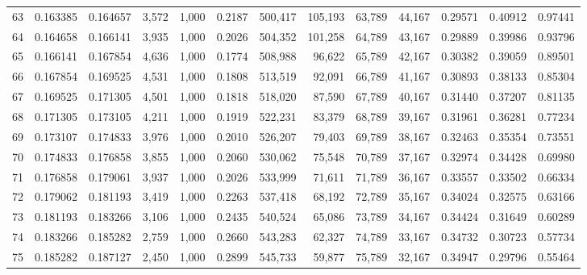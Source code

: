 \begin{tabular}{rrrrrrrrrrrrr}
63  &  0.163385 &  0.164657 &   3,572 &  1,000 &                                     0.2187 &  500,417 &  105,193 &   63,789 &   44,167 &  0.29571 &  0.40912 &  0.97441 \\
64  &  0.164658 &  0.166141 &   3,935 &  1,000 &                                     0.2026 &  504,352 &  101,258 &   64,789 &   43,167 &  0.29889 &  0.39986 &  0.93796 \\
65  &  0.166141 &  0.167854 &   4,636 &  1,000 &                                     0.1774 &  508,988 &   96,622 &   65,789 &   42,167 &  0.30382 &  0.39059 &  0.89501 \\
66  &  0.167854 &  0.169525 &   4,531 &  1,000 &                                     0.1808 &  513,519 &   92,091 &   66,789 &   41,167 &  0.30893 &  0.38133 &  0.85304 \\
67  &  0.169525 &  0.171305 &   4,501 &  1,000 &                                     0.1818 &  518,020 &   87,590 &   67,789 &   40,167 &  0.31440 &  0.37207 &  0.81135 \\
68  &  0.171305 &  0.173105 &   4,211 &  1,000 &                                     0.1919 &  522,231 &   83,379 &   68,789 &   39,167 &  0.31961 &  0.36281 &  0.77234 \\
69  &  0.173107 &  0.174833 &   3,976 &  1,000 &                                     0.2010 &  526,207 &   79,403 &   69,789 &   38,167 &  0.32463 &  0.35354 &  0.73551 \\
70  &  0.174833 &  0.176858 &   3,855 &  1,000 &                                     0.2060 &  530,062 &   75,548 &   70,789 &   37,167 &  0.32974 &  0.34428 &  0.69980 \\
71  &  0.176858 &  0.179061 &   3,937 &  1,000 &                                     0.2026 &  533,999 &   71,611 &   71,789 &   36,167 &  0.33557 &  0.33502 &  0.66334 \\
72  &  0.179062 &  0.181193 &   3,419 &  1,000 &                                     0.2263 &  537,418 &   68,192 &   72,789 &   35,167 &  0.34024 &  0.32575 &  0.63166 \\
73  &  0.181193 &  0.183266 &   3,106 &  1,000 &                                     0.2435 &  540,524 &   65,086 &   73,789 &   34,167 &  0.34424 &  0.31649 &  0.60289 \\
74  &  0.183266 &  0.185282 &   2,759 &  1,000 &                                     0.2660 &  543,283 &   62,327 &   74,789 &   33,167 &  0.34732 &  0.30723 &  0.57734 \\
75  &  0.185282 &  0.187127 &   2,450 &  1,000 &                                     0.2899 &  545,733 &   59,877 &   75,789 &   32,167 &  0.34947 &  0.29796 &  0.55464 \\

\end{tabular}
